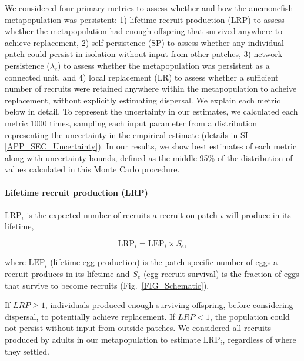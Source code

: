 \documentclass[12pt, oneside]{article}   	%
\begin{document}
We considered four primary metrics to assess whether and how the anemonefish metapopulation was persistent: 1) lifetime recruit production (LRP) to assess whether the metapopulation had enough offspring that survived anywhere to achieve replacement, 2) self-persistence (SP) to assess whether any individual patch could persist in isolation without input from other patches, 3) network persistence ($\lambda_c$) to assess whether the metapopulation was persistent as a connected unit, and 4) local replacement (LR) to assess whether a sufficient number of recruits were retained anywhere within the metapopulation to acheive replacement, without explicitly estimating dispersal. We explain each metric below in detail. To represent the uncertainty in our estimates, we calculated each metric 1000 times, sampling each input parameter from a distribution representing the uncertainty in the empirical estimate (details in SI \ref{APP_SEC_Uncertainty}). In our results, we show best estimates of each metric along with uncertainty bounds, defined as the middle 95\% of the distribution of values calculated in this Monte Carlo procedure. %

\paragraph*{Lifetime recruit production (LRP)}
$\text{LRP}_i$ is the expected number of recruits a recruit on patch $i$ will produce in its lifetime,

\begin{equation}
\text{LRP}_i = \text{LEP}_i \times S_e, \label{EQN_LRP}
\end{equation}

where $\text{LEP}_i$ (lifetime egg production) is the patch-specific number of eggs a recruit produces in its lifetime and $S_e$ (egg-recruit survival) is the fraction of eggs that survive to become recruits (Fig.\ \ref{FIG_Schematic}).

If $LRP \geq 1$, individuals produced enough surviving offspring, before considering dispersal, to potentially achieve replacement. If $LRP < 1$, the population could not persist without input from outside patches. We considered all recruits produced by adults in our metapopulation to estimate $\text{LRP}_i$, regardless of where they settled. %
\end{document}
